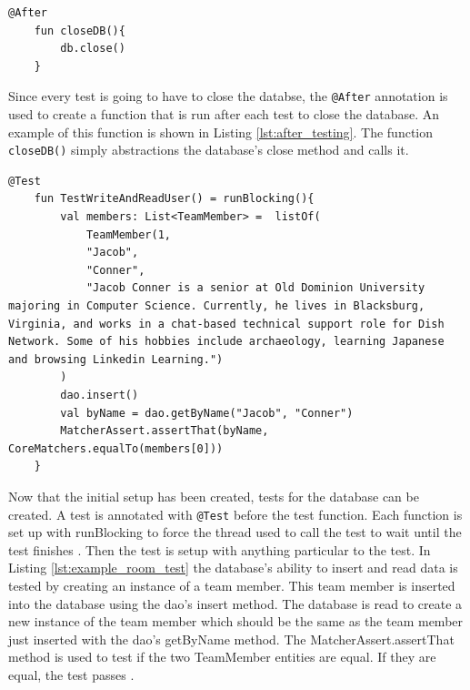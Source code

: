 \documentclass[12pt]{article}
\begin{document}
   \begin{lstlisting}[numbers=none, 
			caption=Code to close the Database after the test,
			label={lst:after_testing}]
    @After
    fun closeDB(){
        db.close()
    }
\end{lstlisting}

Since every test is going to have to close the databse, the \verb|@After| annotation is used to create a function that is run after each test to close the database. An example of this function is shown in Listing \ref{lst:after_testing}. The function \verb|closeDB()| simply abstractions the database's close method and calls it. 

   \begin{lstlisting}[numbers=none, 
			caption=Example Test for Room Database,
			label={lst:example_room_test}]
 @Test
    fun TestWriteAndReadUser() = runBlocking(){
        val members: List<TeamMember> =  listOf(
            TeamMember(1,
            "Jacob",
            "Conner",
            "Jacob Conner is a senior at Old Dominion University majoring in Computer Science. Currently, he lives in Blacksburg, Virginia, and works in a chat-based technical support role for Dish Network. Some of his hobbies include archaeology, learning Japanese and browsing Linkedin Learning.")
        )
        dao.insert()
        val byName = dao.getByName("Jacob", "Conner")
        MatcherAssert.assertThat(byName, CoreMatchers.equalTo(members[0]))
    }
\end{lstlisting}

Now that the initial setup has been created, tests for the database can be created. A test is annotated with  \verb|@Test| before the test function.  Each function is set up with runBlocking to force the thread used to call the test to wait until the test finishes \cite{kotlinCoroutines}.  Then the test is setup with anything particular to the test. In Listing \ref{lst:example_room_test} the database's ability to insert and read data is tested by creating an instance of a team member. This team member is inserted into the database using the dao's insert method. The database is read to create a new instance of the team member which should be the same as the team member just inserted with the dao's getByName method. The MatcherAssert.assertThat method is used to test if the two TeamMember entities are equal. If they are equal, the test passes \cite{SimplifiedCodingRoomTesting}. 


\end{document}
